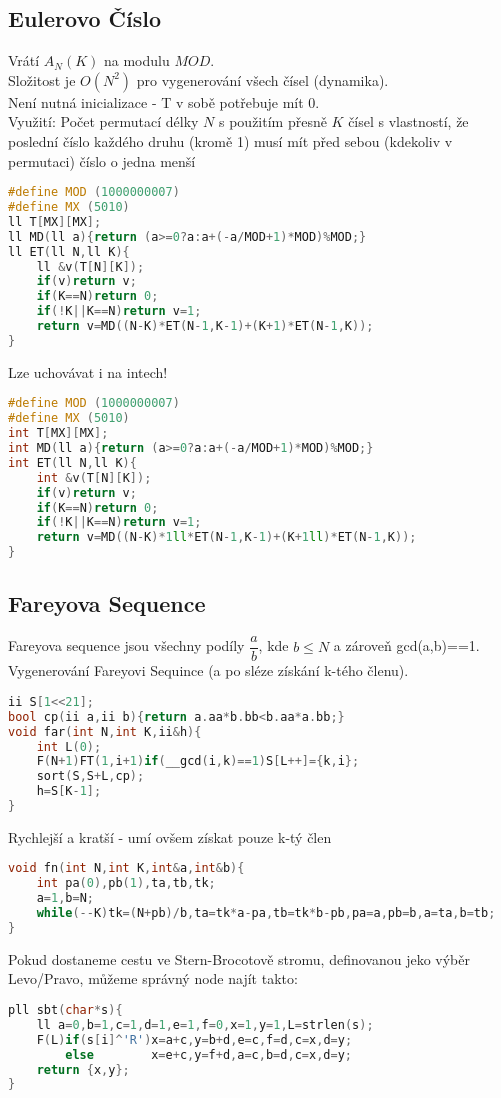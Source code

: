\documentclass[11pt]{article}
\begin{document}
\subsection{Eulerovo Číslo}
Vrátí $A_N(K)$ na modulu $MOD$.
\\Složitost je $O(N^2)$ pro vygenerování všech čísel (dynamika).
\\Není nutná inicializace - \textsf{T} v sobě potřebuje mít $0$.
\\Využití: Počet permutací délky $N$ s použitím přesně $K$ čísel s vlastností, že poslední číslo každého druhu (kromě 1) musí mít před sebou (kdekoliv v permutaci) číslo o jedna menší
\begin{lstlisting}[language=C++]
#define MOD (1000000007)
#define MX (5010)
ll T[MX][MX];
ll MD(ll a){return (a>=0?a:a+(-a/MOD+1)*MOD)%MOD;}
ll ET(ll N,ll K){
    ll &v(T[N][K]);
    if(v)return v;
    if(K==N)return 0;
    if(!K||K==N)return v=1;
    return v=MD((N-K)*ET(N-1,K-1)+(K+1)*ET(N-1,K));
}
\end{lstlisting}
Lze uchovávat i na intech!
\begin{lstlisting}[language=C++]
#define MOD (1000000007)
#define MX (5010)
int T[MX][MX];
int MD(ll a){return (a>=0?a:a+(-a/MOD+1)*MOD)%MOD;}
int ET(ll N,ll K){
    int &v(T[N][K]);
    if(v)return v;
    if(K==N)return 0;
    if(!K||K==N)return v=1;
    return v=MD((N-K)*1ll*ET(N-1,K-1)+(K+1ll)*ET(N-1,K));
}
\end{lstlisting}
\subsection{Fareyova Sequence}
Fareyova sequence jsou všechny podíly $\dfrac{a}{b}$, kde $b\leq N$ a zároveň gcd(a,b)==1.
\\Vygenerování Fareyovi Sequince (a po sléze získání k-tého členu).
\begin{lstlisting}[language=C++]
ii S[1<<21];
bool cp(ii a,ii b){return a.aa*b.bb<b.aa*a.bb;}
void far(int N,int K,ii&h){
    int L(0);
    F(N+1)FT(1,i+1)if(__gcd(i,k)==1)S[L++]={k,i};
    sort(S,S+L,cp);
    h=S[K-1];
}
\end{lstlisting}
Rychlejší a kratší - umí ovšem získat pouze k-tý člen
\begin{lstlisting}[language=C++]
void fn(int N,int K,int&a,int&b){
    int pa(0),pb(1),ta,tb,tk;
    a=1,b=N;
    while(--K)tk=(N+pb)/b,ta=tk*a-pa,tb=tk*b-pb,pa=a,pb=b,a=ta,b=tb;
}
\end{lstlisting}
Pokud dostaneme cestu ve Stern-Brocotově stromu, definovanou jeko výběr Levo/Pravo, můžeme správný node najít takto:
\begin{lstlisting}[language=C++]
pll sbt(char*s){
    ll a=0,b=1,c=1,d=1,e=1,f=0,x=1,y=1,L=strlen(s);
    F(L)if(s[i]^'R')x=a+c,y=b+d,e=c,f=d,c=x,d=y;
        else        x=e+c,y=f+d,a=c,b=d,c=x,d=y;
    return {x,y};
}
\end{lstlisting}
\end{document}
